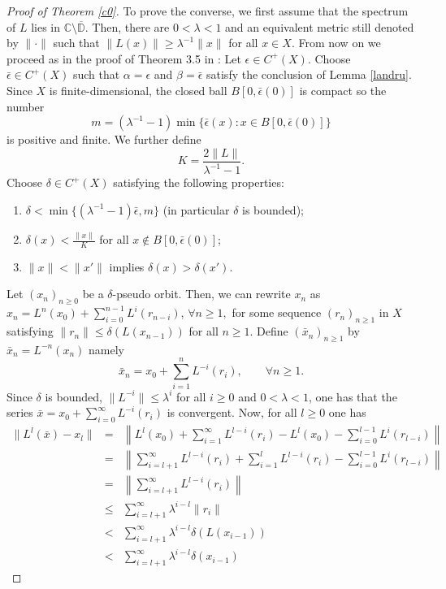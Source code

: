 \documentclass[11pt,letterpaper]{amsart}
\numberwithin{equation}{section}
\begin{document}
\begin{proof}[Proof of Theorem \ref{c0}]
To prove the converse, we
first assume that the spectrum of $L$ lies in $\mathbb{C}\setminus \overline{\mathbb{D}}$.
Then, there are $0<\lambda<1$ and an equivalent metric still denoted by $\|\cdot\|$ such that $\|L(x)\|\geq \lambda^{-1}\|x\|$ for all $x\in X$.
From now on we proceed as in the proof of Theorem 3.5 in \cite{c}:
Let $\epsilon\in C^+(X)$. Choose $\bar{\epsilon}\in C^+(X)$ such that
$\alpha=\epsilon$ and $\beta=\bar{\epsilon}$ satisfy the conclusion of Lemma
\ref{landru}. 
Since $X$ is finite-dimensional, the closed ball $B[0,\bar{\epsilon}(0)]$ is compact so the number
$$
m=(\lambda^{-1}-1)\min\{\bar{\epsilon}(x):x\in B[0,\bar{\epsilon}(0)]\}
$$
is positive and finite. We further define
$$
K=\frac{2\|L\|}{\lambda^{-1}-1}.
$$
Choose $\delta\in C^+(X)$ satisfying the following properties:
\begin{enumerate}
\item[(i)]
$\delta<\min\{(\lambda^{-1}-1)\bar{\epsilon},m\}$ (in particular $\delta$ is bounded);
\item[(ii)]
$\delta(x)<\frac{\|x\|}K$ for all $x\notin B[0,\bar{\epsilon}(0)]$;
\item[(iii)]
$\|x\|<\|x'\|$ implies $\delta(x)>\delta(x')$.
\end{enumerate}
Let $(x_n)_{n\geq0}$ be a $\delta$-pseudo orbit.
Then, we can rewrite $x_n$ as
$x_n=L^n(x_0)+\sum_{i=0}^{n-1}L^i(r_{n-i})$, $\forall n\geq 1,$
for some sequence $(r_n)_{n\geq1}$ in $X$ satisfying
$\|r_n\|\leq \delta(L(x_{n-1}))$ for all $n\geq 1$.
Define $(\bar{x}_n)_{n\geq1}$ by
$\bar{x}_n=L^{-n}(x_n)$ namely
$$
\bar{x}_n=x_0+\sum_{i=1}^nL^{-i}(r_i),\quad\quad \forall n\geq1.
$$
Since $\delta$ is bounded, $\|L^{-i}\|\leq \lambda^i$ for all $i\geq0$ and $0<\lambda<1$,
one has that the series
$
\bar{x}=x_0+\sum_{i=0}^\infty L^{-i}(r_i)
$
is convergent.
Now, for all $l\geq0$ one has
\begin{eqnarray*}
\|L^l(\bar{x})-x_l\|&=&\left\|L^l(x_0)+\sum_{i=1}^\infty L^{l-i}(r_i)-L^l(x_0)-\sum_{i=0}^{l-1}L^i(r_{l-i})\right\|\\
&=&\left\|\sum_{i=l+1}^\infty L^{l-i}(r_i)+\sum_{i=1}^lL^{l-i}(r_i)-\sum_{i=0}^{l-1}L^i(r_{l-i})\right\|\\
&=&\left\| \sum_{i=l+1}^\infty L^{l-i}(r_i)\right\|\\
&\leq& \sum_{i=l+1}^\infty\lambda^{i-l}\|r_i\|\\
&<& \sum_{i=l+1}^\infty \lambda^{i-l}\delta(L(x_{i-1}))\\
&<& \sum_{i=l+1}^\infty \lambda^{i-l}\delta(x_{i-1})
\end{eqnarray*}

\end{proof}
\end{document}
